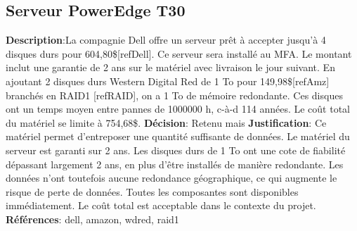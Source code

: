 

\subsection{Serveur PowerEdge T30}
\label{s:archiver_conc1}

\textbf{Description}:La compagnie Dell offre un serveur prêt à accepter jusqu’à 4 disques durs pour 604,80\$[refDell]. Ce serveur sera installé au MFA. Le montant inclut une garantie de 2 ans sur le matériel avec livraison le jour suivant. En ajoutant 2 disques durs Western Digital Red de 1 To pour 149,98\$[refAmz] branchés en RAID1 [refRAID], on a 1 To de mémoire redondante. Ces disques ont un temps moyen entre pannes de 1000000 h, c-à-d 114 années.  Le coût total du matériel se limite à 754,68\$. 
\textbf{Décision}: Retenu mais 
\textbf{Justification}: Ce matériel permet d’entreposer une quantité suffisante de données. Le matériel du serveur est garanti sur 2 ans. Les disques durs de 1 To ont une cote de fiabilité dépassant largement 2 ans, en plus d’être installés de manière redondante. Les données n’ont toutefois aucune redondance géographique, ce qui augmente le risque de perte de données. Toutes les composantes sont disponibles immédiatement. Le coût total est acceptable dans le contexte du projet.
\textbf{Références}: 
dell, amazon, wdred, raid1

